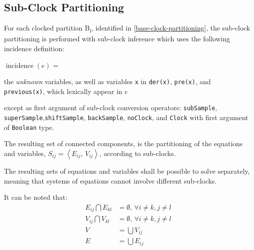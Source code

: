 \subsection{Sub-Clock Partitioning}\label{sub-clock-partitioning}

For each clocked partition B\textsubscript{i}, identified in
\cref{base-clock-partitioning}, the sub-clock partitioning is performed with sub-clock inference
which uses the following incidence definition:

$\operatorname{incidence}(e)$ =
\begin{list}{}{\setlength{\leftmargin}{2em}\setlength{\topsep}{-\parskip}}
\item
the \emph{unknown} variables, as well as variables \lstinline!x! in \lstinline!der(x)!, \lstinline!pre(x)!, and \lstinline!previous(x)!, which lexically appear in $e$
\begin{list}{}{\setlength{\leftmargin}{2em}\setlength{\topsep}{-\parskip}}
\item
except as first argument of sub-clock conversion operators: \lstinline!subSample!, \lstinline!superSample!,\linebreak[4] \lstinline!shiftSample!, \lstinline!backSample!, \lstinline!noClock!, and \lstinline!Clock! with first argument of \lstinline!Boolean! type.
\end{list}
\end{list}\vspace{\parskip}%

The resulting set of connected components, is the partitioning of the equations and variables, $S_{ij} = \left\langle E_{ij},\, V_{ij} \right\rangle$, according to sub-clocks.

The resulting sets of equations and variables shall be possible to solve separately, meaning that systems of equations cannot involve different sub-clocks.

It can be noted that:
\begin{equation*}
\begin{aligned}
E_{ij} \bigcap E_{kl} &= \emptyset,\, \forall i\ne{}k, j\ne{}l \\
V_{ij} \bigcap V_{kl} &= \emptyset,\, \forall i\ne{}k, j\ne{}l \\
V &= \bigcup V_{ij} \\
E &= \bigcup E_{ij}
\end{aligned}
\end{equation*}

